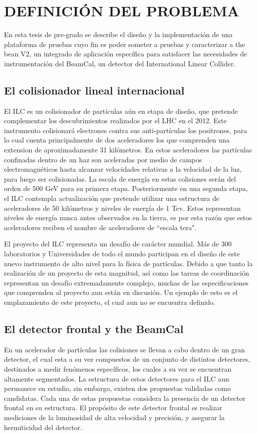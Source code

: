 \chapter{DEFINICIÓN DEL PROBLEMA}
\label{chapter:problem}
En esta tesis de pre-grado se describe el diseño y la implementación de una plataforma de pruebas cuyo fin es poder someter a pruebas y caracterizar a the bean V2, un integrado de aplicación específica para satisfacer las necesidades de instrumentación del BeamCal, un detector del International Linear Collider.

\section{El colisionador lineal internacional}
El ILC es un colisionador de partículas aún  en etapa de diseño, que pretende complementar los descubrimientos realizados por el LHC en el 2012. Este instrumento colisionará electrones contra sus  anti-partículas los positrones, para lo cual cuenta principalmente de dos aceleradores los que comprenden una extension de aproximadamente 31 kilómetros. En estos aceleradores las partículas confinadas dentro de un haz son aceleradas por medio de campos electromagnéticos hasta alcanzar velocidades relativas a la velocidad de la luz, para luego ser colisionadas. La escala de energía en estas colisiones serán del orden de 500 GeV para su primera etapa. Posteriormente en una segunda etapa, el ILC contempla actualización que pretende utilizar una estructura de aceleradores de 50 kilómetros y niveles de energía de 1 Tev. Estos representan niveles de energía nunca antes observados en la tierra, es por esta razón que estos aceleradores reciben el nombre de aceleradores de ``escala tera". 

El proyecto del ILC representa un desafío de carácter mundial. Más de 300 laboratorios y Universidades de todo el mundo participan en el diseño de este nuevo instrumento de alto nivel para la física de partículas.  Debido a que tanto la realización de un proyecto de esta magnitud, así como las tareas de coordinación representan un desafío extremadamente complejo, muchas de las especificaciones que comprenden al proyecto aun están en discusión. Un ejemplo de esto es el emplazamiento de este proyecto, el cual aun no se encuentra definido.


\section{El detector frontal y the BeamCal}
En un acelerador de partículas las colisiones se llevan a cabo dentro de un gran detector, el cual esta a su vez compuestos de un conjunto de distintos detectores, destinados a medir fenómenos específicos, los cuales a su vez se encuentran altamente segmentados. La estructura de estos detectores para el ILC aun permanece en estudio, sin embargo, existen dos propuestas validadas como candidatas. Cada una de estas propuestas considera la presencia de un detector frontal en su estructura. El propósito de este detector frontal es realizar mediciones de la luminosidad de alta velocidad y precisión, y asegurar la hermiticidad del detector.

